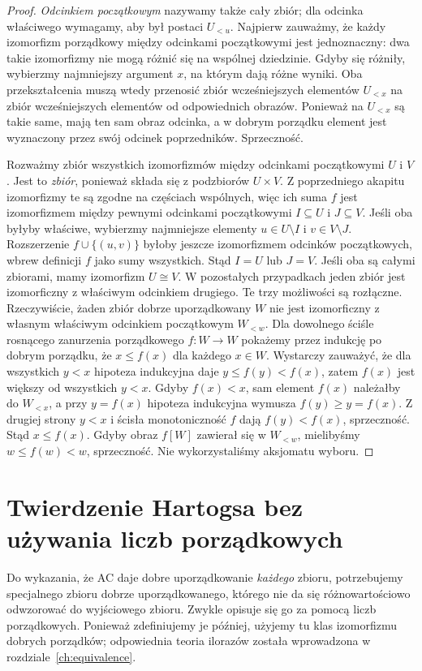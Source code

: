 \begin{proof}
\emph{Odcinkiem początkowym} nazywamy także cały zbiór;
dla odcinka właściwego wymagamy, aby był postaci $U_{<u}$.
Najpierw zauważmy, że każdy izomorfizm porządkowy między
odcinkami początkowymi jest jednoznaczny: dwa takie
izomorfizmy nie mogą różnić się na wspólnej dziedzinie.
Gdyby się różniły, wybierzmy najmniejszy argument $x$,
na którym dają różne wyniki. Oba przekształcenia muszą
wtedy przenosić zbiór wcześniejszych elementów $U_{<x}$
na zbiór wcześniejszych elementów od odpowiednich obrazów.
Ponieważ na $U_{<x}$ są takie same, mają ten sam obraz
odcinka, a w dobrym porządku element jest wyznaczony
przez swój odcinek poprzedników. Sprzeczność.

Rozważmy zbiór wszystkich izomorfizmów między odcinkami
początkowymi $U$ i $V$. Jest to \emph{zbiór}, ponieważ
składa się z podzbiorów $U\times V$.
Z poprzedniego akapitu izomorfizmy te są zgodne na
częściach wspólnych, więc ich suma $f$ jest izomorfizmem
między pewnymi odcinkami początkowymi $I\subseteq U$
i $J\subseteq V$. Jeśli oba byłyby właściwe,
wybierzmy najmniejsze elementy $u\in U\setminus I$
i $v\in V\setminus J$. Rozszerzenie $f\cup\{(u,v)\}$
byłoby jeszcze izomorfizmem odcinków początkowych,
wbrew definicji $f$ jako sumy wszystkich. Stąd
$I=U$ lub $J=V$. Jeśli oba są całymi zbiorami,
mamy izomorfizm $U\cong V$. W pozostałych przypadkach
jeden zbiór jest izomorficzny z właściwym odcinkiem
drugiego. Te trzy możliwości są rozłączne.
Rzeczywiście, żaden zbiór dobrze uporządkowany $W$
nie jest izomorficzny z własnym właściwym odcinkiem
początkowym $W_{<w}$.
Dla dowolnego ściśle rosnącego zanurzenia porządkowego
$f:W\to W$ pokażemy przez indukcję po dobrym porządku,
że $x\le f(x)$ dla każdego $x\in W$.
Wystarczy zauważyć, że dla wszystkich $y<x$
hipoteza indukcyjna daje $y\le f(y)<f(x)$,
zatem $f(x)$ jest większy od wszystkich $y<x$.
Gdyby $f(x)<x$, sam element $f(x)$
należałby do $W_{<x}$, a przy $y=f(x)$ hipoteza indukcyjna
wymusza $f(y)\ge y=f(x)$.
Z drugiej strony $y<x$ i ścisła monotoniczność
$f$ dają $f(y)<f(x)$, sprzeczność. Stąd $x\le f(x)$.
Gdyby obraz $f[W]$ zawierał się w $W_{<w}$,
mielibyśmy $w\le f(w)<w$, sprzeczność.
Nie wykorzystaliśmy aksjomatu wyboru.
\end{proof}

\section{Twierdzenie Hartogsa bez używania liczb porządkowych}
Do wykazania, że AC daje dobre uporządkowanie \emph{każdego}
zbioru, potrzebujemy specjalnego zbioru dobrze uporządkowanego,
którego nie da się różnowartościowo odwzorować do wyjściowego
zbioru. Zwykle opisuje się go za pomocą liczb porządkowych.
Ponieważ zdefiniujemy je później, użyjemy tu klas
izomorfizmu dobrych porządków; odpowiednia teoria ilorazów
została wprowadzona w rozdziale~\ref{ch:equivalence}.

